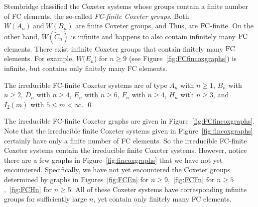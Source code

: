 Stembridge classified the Coxeter systems whose groups contain a finite number of FC elements, the so-called \emph{FC-finite Coxeter groups}. Both $W(A_n)~\mathrm{and}~W(B_n)$ are finite Coxeter groups, and Thus, are $\mathrm{FC}$-finite. On the other hand, $W(\widetilde{C}_n)$ is infinite and happens to also contain infinitely many $\mathrm{FC}$ elements. There exist infinite Coxeter groups that contain finitely many $\mathrm{FC}$ elements. For example, $W(E_n$) for $n \geq 9$ (see Figure~\ref{fig:FCfincoxgraphs}) is infinite, but contains only finitely many FC elements.

\begin{proposition}
\label{thm:FCfinite} The irreducible FC-finite Coxeter systems are of type $A_n$ with $n \geq 1$, $B_n$ with $n \geq 2$, $D_n$ with $n \geq 4$, $E_n$ with $n \geq 6$, $F_n$ with $n \geq 4$, $H_n$ with $n \geq 3$, and $I_2(m)$ with $5 \leq m < \infty$. \qed
\end{proposition} 
 
The irreducible FC-finite Coxeter graphs are given in Figure~\ref{fig:FCfincoxgraphs}. Note that the irreducible finite Coxeter systems given in Figure~\ref{fig:fincoxgraphs} certainly have only a finite number of FC elements. So the irreducible FC-finite Coxeter systems contain the irreducible finite Coxeter systems. However, notice there are a few graphs in Figure~\ref{fig:fincoxgraphs} that we have not yet encountered. Specifically, we have not yet encountered the Coxeter groups determined by graphs in Figures~\ref{fig:FCEn} for $n \geq 9$,~\ref{fig:FCFn} for $n \geq 5$,~\ref{fig:FCHn} for $n \geq 5$. All of these Coxeter systems have corresponding infinite groups for sufficiently large $n$, yet contain only finitely many FC elements.

